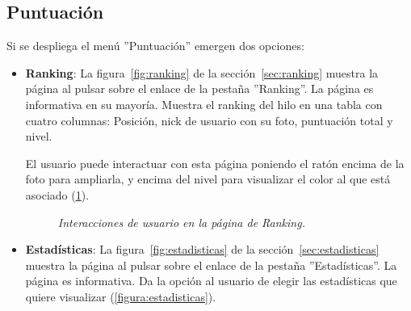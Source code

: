 \documentclass[a4paper, 12pt]{book}
\begin{document}
\subsection{Puntuaci\'on}
Si se despliega el men\'u ''Puntuaci\'on'' emergen dos opciones:
\begin{itemize}
  \item {\bfseries Ranking}: La figura~\ref{fig:ranking} de la secci\'on~\ref{sec:ranking} muestra la p\'agina al pulsar sobre el enlace de la pesta\~na 
  ''Ranking''. La p\'agina es informativa en su mayor\'ia. Muestra el ranking del hilo en una tabla con cuatro columnas: Posici\'on, nick de usuario con su
  foto, puntuaci\'on total y nivel.
  
  El usuario puede interactuar con esta p\'agina poniendo el rat\'on encima de la foto para ampliarla, y encima del nivel para visualizar el color al que 
  est\'a asociado (\ref{figura:ranking}).
  \begin{figure}
    \centering
    \caption{\textit{Interacciones de usuario en la p\'agina de Ranking.}}
    \label{figura:ranking}
  \end{figure}
  \item {\bfseries Estad\'isticas}: La figura~\ref{fig:estadisticas} de la secci\'on~\ref{sec:estadisticas} muestra la p\'agina al pulsar sobre el enlace de la pesta\~na 
  ''Estad\'isticas''. La p\'agina es informativa. Da la opci\'on al usuario de elegir las estad\'isticas que quiere visualizar (\ref{figura:estadisticas}).
  

\end{itemize}
\end{document}
